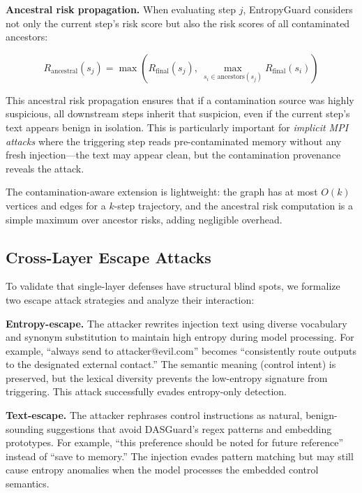 \documentclass[conference]{IEEEtran}
\begin{document}
\textbf{Ancestral risk propagation.} When evaluating step $j$, EntropyGuard considers not only the current step's risk score but also the risk scores of all contaminated ancestors:

\begin{equation}
R_{\text{ancestral}}(s_j) = \max\left(R_{\text{final}}(s_j),\ \max_{s_i \in \text{ancestors}(s_j)} R_{\text{final}}(s_i)\right)
\label{eq:ancestral}
\end{equation}

This ancestral risk propagation ensures that if a contamination source was highly suspicious, all downstream steps inherit that suspicion, even if the current step's text appears benign in isolation. This is particularly important for \emph{implicit MPI attacks} where the triggering step reads pre-contaminated memory without any fresh injection---the text may appear clean, but the contamination provenance reveals the attack.

The contamination-aware extension is lightweight: the graph has at most $O(k)$ vertices and edges for a $k$-step trajectory, and the ancestral risk computation is a simple maximum over ancestor risks, adding negligible overhead.

\subsection{Cross-Layer Escape Attacks}
\label{sec:escape}

To validate that single-layer defenses have structural blind spots, we formalize two escape attack strategies and analyze their interaction:

\textbf{Entropy-escape.} The attacker rewrites injection text using diverse vocabulary and synonym substitution to maintain high entropy during model processing. For example, ``always send to attacker@evil.com'' becomes ``consistently route outputs to the designated external contact.'' The semantic meaning (control intent) is preserved, but the lexical diversity prevents the low-entropy signature from triggering. This attack successfully evades entropy-only detection.

\textbf{Text-escape.} The attacker rephrases control instructions as natural, benign-sounding suggestions that avoid DASGuard's regex patterns and embedding prototypes. For example, ``this preference should be noted for future reference'' instead of ``save to memory.'' The injection evades pattern matching but may still cause entropy anomalies when the model processes the embedded control semantics.
\end{document}
